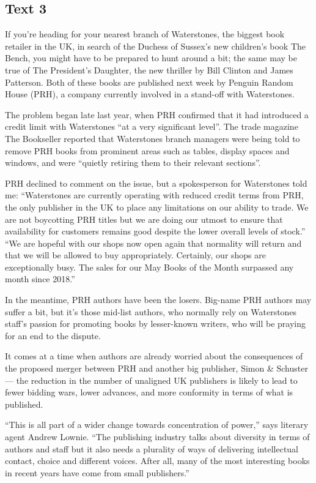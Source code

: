 \newpage
\subsection{Text 3}

If you're heading for your nearest branch of Waterstones, the biggest book retailer in the UK, in search of the Duchess of Sussex's new children's book The Bench, you might have to be prepared to hunt around a bit; the same may be true of The President's Daughter, the new thriller by Bill Clinton and James Patterson. Both of these books are published next week by Penguin Random House (PRH), a company currently involved in a stand-off with Waterstones.

The problem began late last year, when PRH confirmed that it had introduced a credit limit with Waterstones ``at a very significant level''. The trade magazine The Bookseller reported that Waterstones branch managers were being told to remove PRH books from prominent areas such as tables, display spaces and windows, and were ``quietly retiring them to their relevant sections''.

PRH declined to comment on the issue, but a spokesperson for Waterstones told me: ``Waterstones are currently operating with reduced credit terms from PRH, the only publisher in the UK to place any limitations on our ability to trade. We are not boycotting PRH titles but we are doing our utmost to ensure that availability for customers remains good despite the lower overall levels of stock.'' ``We are hopeful with our shops now open again that normality will return and that we will be allowed to buy appropriately. Certainly, our shops are exceptionally busy. The sales for our May Books of the Month surpassed any month since 2018.''

In the meantime, PRH authors have been the losers. Big-name PRH authors may suffer a bit, but it's those mid-list authors, who normally rely on Waterstones staff's passion for promoting books by lesser-known writers, who will be praying for an end to the dispute.

It comes at a time when authors are already worried about the consequences of the proposed merger between PRH and another big publisher, Simon \& Schuster — the reduction in the number of unaligned UK publishers is likely to lead to fewer bidding wars, lower advances, and more conformity in terms of what is published.

``This is all part of a wider change towards concentration of power,'' says literary agent Andrew Lownie. ``The publishing industry talks about diversity in terms of authors and staff but it also needs a plurality of ways of delivering intellectual contact, choice and different voices. After all, many of the most interesting books in recent years have come from small publishers.''

